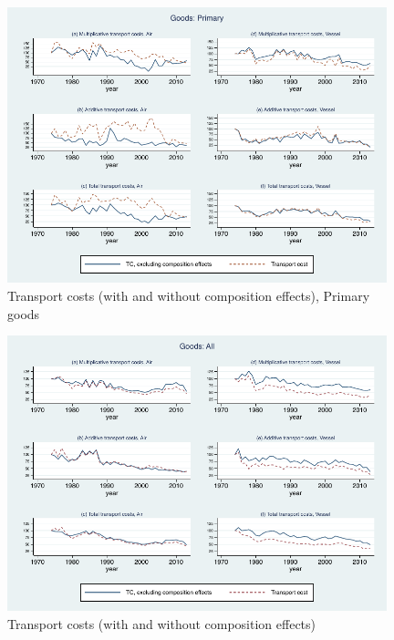 \documentclass[11pt,twoside, authoryear]{elsarticle}
\begin{document}
\begin{figure}[htbp]
\caption{Transport costs (with and without composition effects), Primary goods}
\label{fig:totalTC_compeffects_excl_primary}
\begin{center}
\includegraphics[height=8cm]
{graph_composition_primary.pdf}
\end{center}
\end{figure}

\begin{figure}[htbp]
\caption{Transport costs (with and without composition effects)}
\label{fig:totalTC_compeffects_excl}
\begin{center}
\includegraphics[height=8cm]
{graph_composition_all.pdf}
\end{center}
\end{figure}
\end{document}
